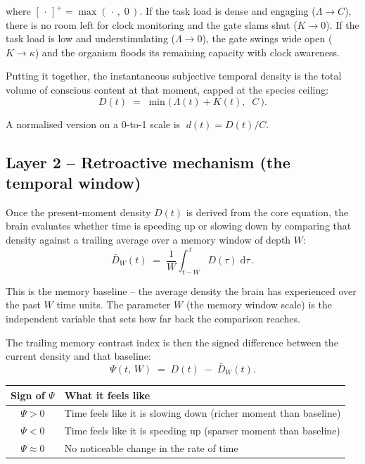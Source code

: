 \documentclass[11pt,a4paper]{article}
\begin{document}
where $[\,\cdot\,]^{+} = \max(\,\cdot\,,\;0\,)$. If the task load is dense and engaging ($\Lambda \to C$), there is no room left for clock monitoring and the gate slams shut ($K \to 0$). If the task load is low and understimulating ($\Lambda \to 0$), the gate swings wide open ($K \to \kappa$) and the organism floods its remaining capacity with clock awareness.

Putting it together, the instantaneous subjective temporal density is the total volume of conscious content at that moment, capped at the species ceiling:
\begin{equation}
	D(t) \;=\; \min\!\bigl(\,\Lambda(t) + K(t),\;\; C\,\bigr).
\end{equation}

A normalised version on a 0-to-1 scale is $\;d(t) = D(t)/C$.

\subsection{Layer 2 -- Retroactive mechanism (the temporal window)}

Once the present-moment density $D(t)$ is derived from the core equation, the brain evaluates whether time is speeding up or slowing down by comparing that density against a trailing average over a memory window of depth $W$:
\begin{equation}
	\bar{D}_W(t) \;=\; \frac{1}{W}\int_{t-W}^{\,t} D(\tau)\;\mathrm{d}\tau\,.
\end{equation}

This is the memory baseline -- the average density the brain has experienced over the past $W$ time units. The parameter $W$ (the memory window scale) is the independent variable that sets how far back the comparison reaches.

The trailing memory contrast index is then the signed difference between the current density and that baseline:
\begin{equation}
	\Psi(t,\,W) \;=\; D(t) \;-\; \bar{D}_W(t).
\end{equation}

\begin{center}
	\renewcommand{\arraystretch}{1.3}
	\begin{tabular}{@{}cl@{}}
		\toprule
		Sign of $\Psi$ & What it feels like \\
		\midrule
		$\Psi > 0$ & Time feels like it is slowing down (richer moment than baseline) \\
		$\Psi < 0$ & Time feels like it is speeding up (sparser moment than baseline) \\
		$\Psi \approx 0$ & No noticeable change in the rate of time \\
		\bottomrule
	\end{tabular}
\end{center}
\end{document}
